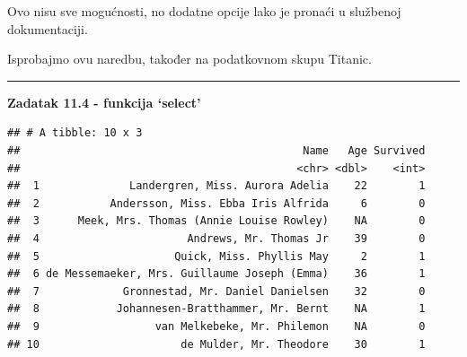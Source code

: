 \documentclass[]{book}
\newenvironment{Shaded}{\begin{snugshade}}{\end{snugshade}}
\newcommand{\KeywordTok}[1]{\textcolor[rgb]{0.13,0.29,0.53}{\textbf{#1}}}
\newcommand{\DecValTok}[1]{\textcolor[rgb]{0.00,0.00,0.81}{#1}}
\newcommand{\StringTok}[1]{\textcolor[rgb]{0.31,0.60,0.02}{#1}}
\newcommand{\CommentTok}[1]{\textcolor[rgb]{0.56,0.35,0.01}{\textit{#1}}}
\newcommand{\OperatorTok}[1]{\textcolor[rgb]{0.81,0.36,0.00}{\textbf{#1}}}
\newcommand{\NormalTok}[1]{#1}
\theoremstyle{definition}
\theoremstyle{definition}
\theoremstyle{definition}
\theoremstyle{remark}
\begin{document}
Ovo nisu sve mogućnosti, no dodatne opcije lako je pronaći u službenoj
dokumentaciji.

Isprobajmo ovu naredbu, također na podatkovnom skupu Titanic.

\begin{center}\rule{0.5\linewidth}{\linethickness}\end{center}

\textbf{Zadatak 11.4 - funkcija `select'}

\begin{Shaded}
\end{Shaded}

\begin{Shaded}
\end{Shaded}

\begin{verbatim}
## # A tibble: 10 x 3
##                                            Name   Age Survived
##                                           <chr> <dbl>    <int>
##  1              Landergren, Miss. Aurora Adelia    22        1
##  2           Andersson, Miss. Ebba Iris Alfrida     6        0
##  3      Meek, Mrs. Thomas (Annie Louise Rowley)    NA        0
##  4                       Andrews, Mr. Thomas Jr    39        0
##  5                     Quick, Miss. Phyllis May     2        1
##  6 de Messemaeker, Mrs. Guillaume Joseph (Emma)    36        1
##  7             Gronnestad, Mr. Daniel Danielsen    32        0
##  8            Johannesen-Bratthammer, Mr. Bernt    NA        1
##  9                  van Melkebeke, Mr. Philemon    NA        0
## 10                      de Mulder, Mr. Theodore    30        1
\end{verbatim}
\end{document}
